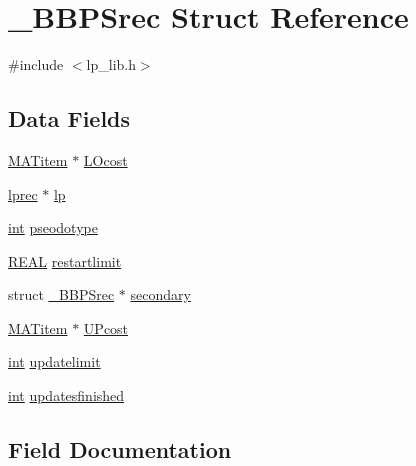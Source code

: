\hypertarget{struct___b_b_p_srec}{}\section{\+\_\+\+B\+B\+P\+Srec Struct Reference}
\label{struct___b_b_p_srec}


{\ttfamily \#include $<$lp\+\_\+lib.\+h$>$}

\subsection*{Data Fields}
\begin{DoxyCompactItemize}
\item 
\hyperlink{lp__matrix_8h_a38536c4d327d55cc83cd661d596556da}{M\+A\+Titem} $\ast$ \hyperlink{struct___b_b_p_srec_a098eb4009ee679a720e5f26309000891}{L\+Ocost}
\item 
\hyperlink{lp__types_8h_afe42f1373b9ee8d824b5cad6a22d24c6}{lprec} $\ast$ \hyperlink{struct___b_b_p_srec_a30c55989fc455b6143d9acf2ff608750}{lp}
\item 
\hyperlink{lp__lib_8h_adeb9ec6400320e4923ac9d836d509ddb}{int} \hyperlink{struct___b_b_p_srec_a88fc521e07714f5dbed6617e5d4f862b}{pseodotype}
\item 
\hyperlink{lp__lib_8h_a92bd5e363d131fa73669358edb232dce}{R\+E\+AL} \hyperlink{struct___b_b_p_srec_a0ab312c6c92e713bdde4b9d325058c77}{restartlimit}
\item 
struct \hyperlink{struct___b_b_p_srec}{\+\_\+\+B\+B\+P\+Srec} $\ast$ \hyperlink{struct___b_b_p_srec_ab5028e1ccba8e1d20e47e7b9dc12559c}{secondary}
\item 
\hyperlink{lp__matrix_8h_a38536c4d327d55cc83cd661d596556da}{M\+A\+Titem} $\ast$ \hyperlink{struct___b_b_p_srec_a2d959208ecbd8175dad8e786be5d7ec3}{U\+Pcost}
\item 
\hyperlink{lp__lib_8h_adeb9ec6400320e4923ac9d836d509ddb}{int} \hyperlink{struct___b_b_p_srec_a21fdbc8626455db1d078b5049c8497ea}{updatelimit}
\item 
\hyperlink{lp__lib_8h_adeb9ec6400320e4923ac9d836d509ddb}{int} \hyperlink{struct___b_b_p_srec_a39bc15a8590b62826ddc018386536ea1}{updatesfinished}
\end{DoxyCompactItemize}


\subsection{Field Documentation}
\mbox{\label{struct___b_b_p_srec_a098eb4009ee679a720e5f26309000891}} 
